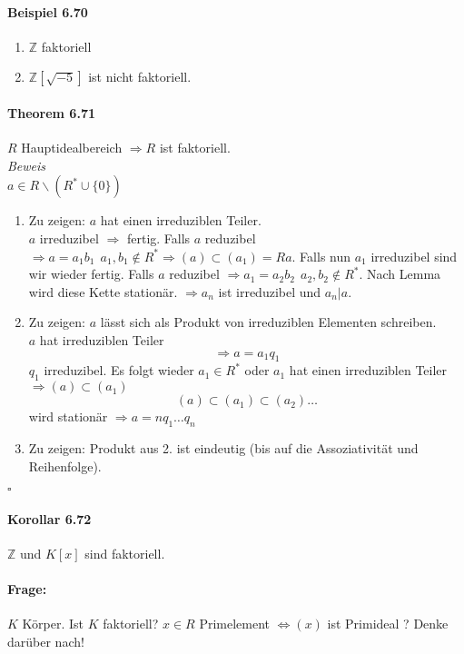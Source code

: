 \documentclass{scrartcl}
\begin{document}
\paragraph{Beispiel 6.70}
\begin{enumerate}
\item $\mathbb{Z}$ faktoriell
\item $\mathbb{Z}\left[\sqrt{-5}\right]$ ist nicht faktoriell.
\end{enumerate}

\paragraph{Theorem 6.71}
$R$ Hauptidealbereich $\Rightarrow R$ ist faktoriell. \\
\textit{Beweis} \\
$a \in R\backslash (R^*\cup \{0\})$
\begin{enumerate}
\item Zu zeigen: $a$ hat einen irreduziblen Teiler. \\
  $a$ irreduzibel $\Rightarrow$ fertig. Falls $a$ reduzibel $\Rightarrow a =
  a_1b_1 ~~ a_1,b_1 \notin R^* \Rightarrow (a) \subset (a_1) = Ra$. Falls nun
  $a_1$ irreduzibel sind wir wieder fertig. Falls $a$ reduzibel $\Rightarrow
  a_1 = a_2b_2 ~~ a_2,b_2 \notin R^*$. Nach Lemma wird diese Kette stationär.
  $\Rightarrow a_n$ ist irreduzibel und $a_n|a$.
\item Zu zeigen: $a$ lässt sich als Produkt von irreduziblen Elementen
  schreiben. \\
  $a$ hat irreduziblen Teiler
  \[
    \Rightarrow a = a_1q_1
  \]
  $q_1$ irreduzibel. Es folgt wieder $a_1 \in R^*$ oder $a_1$ hat einen
  irreduziblen Teiler $\Rightarrow (a) \subset (a_1)$
  \[
    (a) \subset (a_1) \subset (a_2) \dots
  \]
  wird stationär $\Rightarrow a = n q_1 \dots q_n$
  
\item Zu zeigen: Produkt aus 2. ist eindeutig (bis auf die Assoziativität und
  Reihenfolge).
\end{enumerate}
\hfill $\square$

\paragraph{Korollar 6.72}
$\mathbb{Z}$ und $K[x]$ sind faktoriell.

\paragraph{Frage:} $K$ Körper. Ist $K$ faktoriell?
$x \in R$ Primelement $\Leftrightarrow (x)$ ist Primideal ?
Denke darüber nach!
\end{document}
